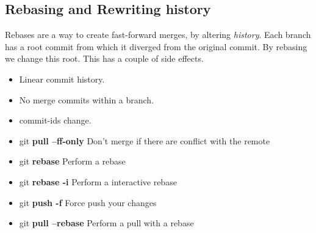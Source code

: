 \documentclass{beamer}
\begin{document}
\subsection{Rebasing and Rewriting history}
\begin{frame}[fragile]
  Rebases are a way to create fast-forward merges, by altering \emph{history}. Each branch has a root commit from which it diverged from the original commit. By rebasing we change this root. This has a couple of side effects. 
  \begin{itemize}
    \item Linear commit history.
    \item No merge commits within a branch.
    \item commit-ids change.
  \end{itemize}

  \begin{block}{}
    \begin{itemize}
      \item git \textbf{pull --ff-only} Don't merge if there are conflict with the remote
      \item git \textbf{rebase} Perform a rebase
      \item git \textbf{rebase -i} Perform a interactive rebase
      \item git \textbf{push -f} Force push your changes
      \item git \textbf{pull --rebase} Perform a pull with a rebase
    \end{itemize}
  \end{block}
\end{frame}
\end{document}
